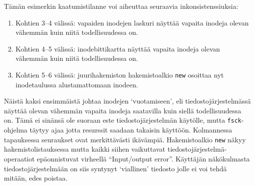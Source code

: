 Tämän esimerkin kaatumistilanne voi aiheuttaa seuraavia inkonsistenssiuksia:
\begin{enumerate}
    \item{Kohtien 3--4 välissä: vapaiden inodejen laskuri näyttää vapaita inodeja olevan vähemmän kuin niitä todellisuudessa on.}
    \item{Kohtien 4--5 välissä: inodebittikartta näyttää vapaita inodeja olevan vähemmän kuin niitä todellisuudessa on.}
    \item{Kohtien 5--6 välissä: juurihakemiston hakemistoalkio \texttt{new} osoittaa nyt inodetaulussa alustamattomaan inodeen.}
\end{enumerate}

Näistä kaksi ensimmäistä johtaa inodejen `vuotamiseen',
eli tiedostojärjestelmässä näyttää olevan vähemmän vapaita inodeja saatavilla kuin siellä todellisuudessa on.
Tämä ei sinänsä ole suoraan este tiedostojärjestelmän käytölle,
mutta \texttt{fsck}-ohjelma täytyy ajaa jotta resurssit saadaan takaisin käyttöön.
Kolmannessa tapauksessa seuraukset ovat merkittävästi ikävämpiä.
Hakemistoalkio \texttt{new} näkyy hakemistolistauksessa mutta kaikki siihen vaikuttavat tiedostojärjestelmä-operaatiot epäonnistuvat virheellä ``Input/output error''.
Käyttäjän näkökulmasta tiedostojärjestelmään on siis syntynyt `viallinen' tiedosto jolle ei voi tehdä mitään, edes poistaa.


